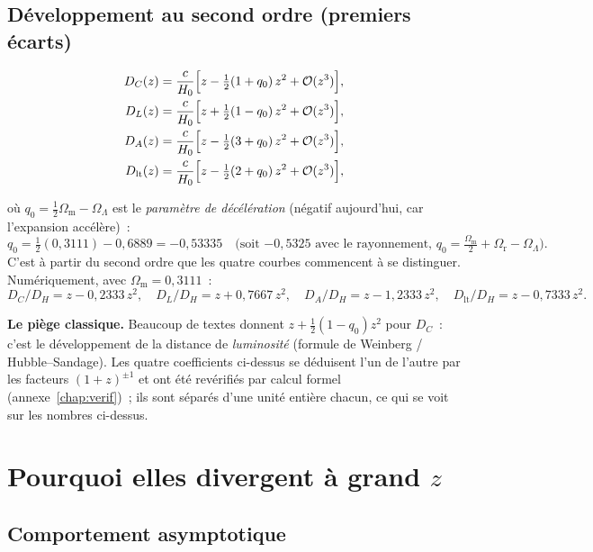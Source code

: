 \documentclass[11pt,a4paper,openany]{report}
\newcommand{\Hzero}{H_{0}}
\newcommand{\Om}{\Omega_{\mathrm{m}}}
\newcommand{\Or}{\Omega_{\mathrm{r}}}
\newcommand{\OL}{\Omega_{\Lambda}}
\begin{document}
\subsection{Développement au second ordre (premiers écarts)}

\begin{align}
D_{C}(z)         &= \frac{c}{\Hzero}\Bigl[z - \tfrac{1}{2}(1+q_{0})\,z^{2} + \mathcal{O}(z^{3})\Bigr],
\label{eq:DL2_DC}\\
D_{L}(z)         &= \frac{c}{\Hzero}\Bigl[z + \tfrac{1}{2}(1-q_{0})\,z^{2} + \mathcal{O}(z^{3})\Bigr],
\label{eq:DL2_DL}\\
D_{A}(z)         &= \frac{c}{\Hzero}\Bigl[z - \tfrac{1}{2}(3+q_{0})\,z^{2} + \mathcal{O}(z^{3})\Bigr],
\label{eq:DL2_DA}\\
D_{\text{lt}}(z) &= \frac{c}{\Hzero}\Bigl[z - \tfrac{1}{2}(2+q_{0})\,z^{2} + \mathcal{O}(z^{3})\Bigr],
\label{eq:DL2_Dlt}
\end{align}

\noindent où $q_{0} = \tfrac{1}{2}\Om - \OL$ est le \emph{paramètre de
décélération} (négatif aujourd'hui, car l'expansion accélère)~:
\[
q_{0} = \tfrac{1}{2}(0{,}3111) - 0{,}6889 = -0{,}53335
\quad\text{(soit $-0{,}5325$ avec le rayonnement, $q_0=\tfrac{\Om}{2}+\Or-\OL$).}
\]
C'est à partir du second ordre que les quatre courbes commencent à se
distinguer. Numériquement, avec $\Om = 0{,}3111$~:
\[
D_{C}/D_{H} = z - 0{,}2333\,z^{2},\quad
D_{L}/D_{H} = z + 0{,}7667\,z^{2},\quad
D_{A}/D_{H} = z - 1{,}2333\,z^{2},\quad
D_{\text{lt}}/D_{H} = z - 0{,}7333\,z^{2}.
\]

\begin{tcolorbox}[attention]
\textbf{Le piège classique.} Beaucoup de textes donnent
$z + \tfrac12(1-q_0)z^2$ pour $D_{C}$~: c'est le développement de la distance
de \emph{luminosité} (formule de Weinberg / Hubble--Sandage). Les quatre
coefficients ci-dessus se déduisent l'un de l'autre par les facteurs $(1+z)^{\pm1}$
et ont été revérifiés par calcul formel (annexe~\ref{chap:verif})~; ils sont
séparés d'une unité entière chacun, ce qui se voit sur les nombres ci-dessus.
\end{tcolorbox}

\section{Pourquoi elles divergent à grand $z$}

\subsection{Comportement asymptotique}
\end{document}
